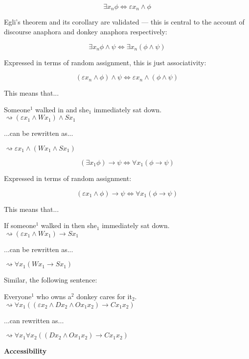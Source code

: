 \documentclass[nols,twoside,nofonts,nobib,nohyper]{tufte-handout}
\providecommand{\tightlist}{%
  \setlength{\itemsep}{0pt}\setlength{\parskip}{0pt}}
\theoremstyle{observation}
\theoremstyle{theorem}
\theoremstyle{corollary}
\theoremstyle{definition}
\begin{document}
\begin{tcolorbox}[title=Existential quantification and random assignment]
$$
∃x_{n} ϕ ⇔ εx_{n} ∧ ϕ
$$
\end{tcolorbox}

Egli's theorem and its corollary are validated --- this is central to the account of discourse anaphora and donkey anaphora respectively:

\begin{tcolorbox}[title=Egli's theorem]
\tightlist

$$∃x_{n} ϕ ∧ ψ ⇔ ∃x_{n} (ϕ ∧ ψ)$$

\tcblower
Expressed in terms of random assignment, this is just associativity:

$$
    (εx_{n} ∧ ϕ) ∧ ψ ⇔ εx_{n} ∧ (ϕ ∧ ψ)
    $$
\end{tcolorbox}

This means that...

\ex
Someone$^{1}$ walked in and she$_{1}$ immediately sat down.\\
$\rightsquigarrow (εx_{1} ∧ W x_{1}) ∧ S x_{1}$
\xe

...can be rewritten as...

\ex
$\rightsquigarrow εx_{1} ∧ (W x_{1} ∧ S x_{1})$
\xe

\begin{tcolorbox}[title=Egli's corollary]
$$
    (∃x_{1} ϕ) → ψ ⇔ ∀x_{1} (ϕ → ψ)
    $$

    \tcblower
Expressed in terms of random assignment:

$$
    (εx_{1} ∧ ϕ) → ψ ⇔ ∀x_{1} (ϕ → ψ)
    $$
\end{tcolorbox}

This means that...

\ex
If someone$^{1}$ walked in then she$_{1}$ immediately sat down.\\
$⇝ (εx_{1} ∧ W x_{1}) → S x_{1}$
\xe

...can be rewritten as...

\ex
$⇝ ∀x_{1} (W x_{1} → S x_{1})$
\xe

Similar, the following sentence:

\ex
Everyone$^{1}$ who owns a$^{2}$ donkey cares for it$_{2}$.\\
$⇝ ∀x_{1}((εx_{2} ∧ D x_{2} ∧ O x_{1} x_{2}) → C x_{1} x_{2})$
\xe

...can rewritten as...

\ex
$⇝ ∀x_{1}∀x_{2}((D x_{2} ∧ O x_{1} x_{2}) → C x_{1} x_{2})$
\xe

  \textbf{Accessibility}
\end{document}
